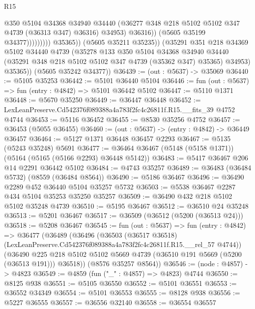 \begin{lexlean}{R15}
\begin{coremodule}
{{{{{{{{{{{                                    @350
                                    @5104
                                    @34368
                                    @34940
                                    @34440
                                    (@36277 @348 @218 @5102 @5102 @347 @4739 (@36313 @347) @36316)
                                    @34953)
                                  @36316))
                              (@5605 @35199 @34377)))))))))
              @35365))
          (@5605 @35211 @35235))
        (@35291
          @351
          @218
          @34369
          @5102
          @34440
          @4739
          (@35278
            @133
            @350
            @5104
            @34368
            @34940
            @34440
            (@35291 @348 @218 @5102 @5102 @347 @4739 (@35362 @347) @35365)
            @34953)
          @35365))
      (@5605 @35242 @34377))
@36439 := (out : @5637) -> @35069
@36440 := @5105 @35253
@36442 := @5101 @36440 @5104
@36446 := fun (out : @5637) => fun (entry : @4842) => @5101 @36442 @5102
@36447 := @5110 @1371
@36448 := @5670 @35250
@36449 := @36447 @36448
@36452 := LexLeanPreserve.Cd542376f089388a4a783f2fc4c26811f.R15.__fits_39 @4752 @4744
@36453 := @5116 @36452
@36455 := @8530 @35256 @4752
@36457 := @36453 (@5055 @36455)
@36460 := (out : @5637) -> (entry : @4842) -> @36449 @36457
@36464 := @5127 @1371 @36448 @36457 @2293
@36467 := @5135 (@5243 @35248) @5691
@36477 := @36464 @36467 (@5148 (@5158 @1371)) (@5164 (@5165 (@5166 @2293) @36448 @5142))
@36483 := @5417 @36467 @206 @14 @2291 @36442 @5102
@36484 := @4743 @35257
@36489 := @36483 (@36484 @5732) (@8559 (@36484 @8564))
@36490 := @5186 @36467
@36496 := @36490 @2289 @452 @36440 @5104 @35257 @5732
@36503 := @5538 @36467 @2287 @434 @5104 @35253 @35250 @35257
@36509 := @36490 @432 @218 @5102 @5102 @35248 @4739
@36510 := @5195 @36467
@36512 := @36510 @24 @35248
@36513 := @5201 @36467
@36517 := @36509 (@36512 (@5200 (@36513 @24)))
@36518 := @5208 @36467
@36545 := fun (out : @5637) =>
  fun (entry : @4842) =>
  @36477
    (@36489
      (@36496
        (@36503
          (@36517 @36518)
          (LexLeanPreserve.Cd542376f089388a4a783f2fc4c26811f.R15.__rel_57 @4744))
        (@36490 @225 @218 @5102 @5102 @5669 @4739 (@36510 @191 @5669 (@5200 (@36513 @191))) @36518))
      (@8576 @35257 @8564))
@36546 := (node : @4857) -> @4823
@36549 := @4859 (fun ("_" : @4857) => @4823) @4744
@36550 := @8125 @938
@36551 := @5105 @36550
@36552 := @5101 @36551
@36553 := @36552 @34349
@36554 := @5101 @36553
@36555 := @8128 @938
@36556 := @5227 @36555
@36557 := @36556 @32140
@36558 := @36554 @36557
}}}}}}}}}}}
\end{coremodule}
\end{lexlean}
